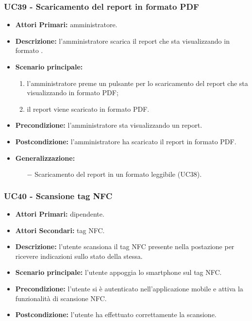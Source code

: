 \subsubsection{ UC39 - Scaricamento del report in formato PDF}
\begin{itemize}
	\item\textbf{Attori Primari:} 
	amministratore.
	\item\textbf{Descrizione:} 
	l'amministratore scarica il report che sta visualizzando in formato .
	\item\textbf{Scenario principale:} 
	\begin{enumerate}
		\item l'amministratore preme un pulsante per lo scaricamento del report che sta visualizzando in formato PDF;
		\item il report viene scaricato in formato PDF.
	\end{enumerate}
	\item\textbf{Precondizione:} 
	l'amministratore sta visualizzando un report.
	\item\textbf{Postcondizione:}
	l'amministratore ha scaricato il report in formato PDF.
	\item\textbf{Generalizzazione:}
	\begin{itemize}
		\item[$-$] Scaricamento del report in un formato leggibile (UC38).
	\end{itemize}
\end{itemize}

\subsubsection{ UC40 - Scansione tag NFC}
\begin{itemize}
	\item\textbf{Attori Primari:} dipendente.
	\item\textbf{Attori Secondari:} tag NFC.
	\item\textbf{Descrizione:} l’utente scansiona il tag NFC presente nella postazione per ricevere indicazioni sullo stato della stessa.
	\item\textbf{Scenario principale:} l’utente appoggia lo smartphone sul tag NFC.
	\item\textbf{Precondizione:} l’utente si è autenticato nell'applicazione mobile e attiva la funzionalità di scansione NFC.
	\item\textbf{Postcondizione:} l’utente ha effettuato correttamente la scansione.
\end{itemize}


